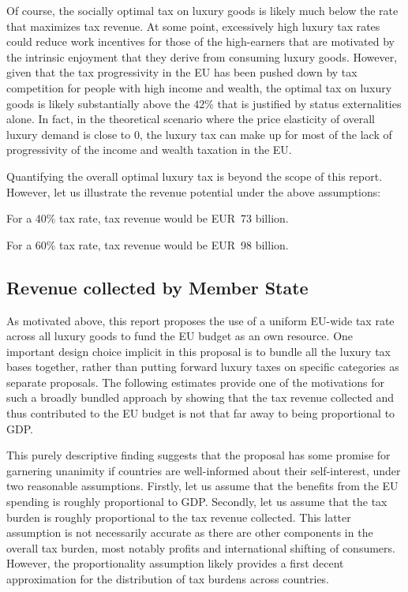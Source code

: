 \documentclass[../../main]{subfiles}
\begin{document}
Of course, the socially optimal tax on luxury goods is likely much below the rate that maximizes tax revenue. At some point, excessively high luxury tax rates could reduce work incentives for those of the high-earners that are motivated by the intrinsic enjoyment that they derive from consuming luxury goods. However, given that the tax progressivity in the EU has been pushed down by tax competition for people with high income and wealth, the optimal tax on luxury goods is likely substantially above the $42\%$ that is justified by status externalities alone. In fact, in the theoretical scenario where the price elasticity of overall luxury demand is close to 0, the luxury tax can make up for most of the lack of progressivity of the income and wealth taxation in the EU. 

Quantifying the overall optimal luxury tax is beyond the scope of this report. However, let us illustrate the revenue potential under the above assumptions:

For a 40\% tax rate, %
tax revenue would be EUR~73 billion. 

For a 60\% tax rate, 
tax revenue would be EUR~98 billion. 

\subsection{Revenue collected by Member State } \label{tax revenue estimates by eu member states}

As motivated above, this report proposes the use of a uniform EU-wide tax rate across all luxury goods to fund the EU budget as an own resource. One important design choice implicit in this proposal is to bundle all the luxury tax bases together, rather than putting forward luxury taxes on specific categories as separate proposals. The following estimates provide one of the motivations for such a broadly bundled approach by showing that the tax revenue collected and thus contributed to the EU budget is not that far away to being proportional to GDP.

This purely descriptive finding suggests that the proposal has some promise for garnering unanimity if countries are well-informed about their self-interest, under two reasonable assumptions. Firstly, let us assume that the benefits from the EU spending is roughly proportional to GDP. %
Secondly, let us assume that the tax burden is roughly proportional to the tax revenue collected. This latter assumption is not necessarily accurate as there are other components in the overall tax burden, most notably profits and international shifting of consumers. However, the proportionality assumption likely provides a first decent approximation for the 
distribution of tax burdens across countries. %
\end{document}
